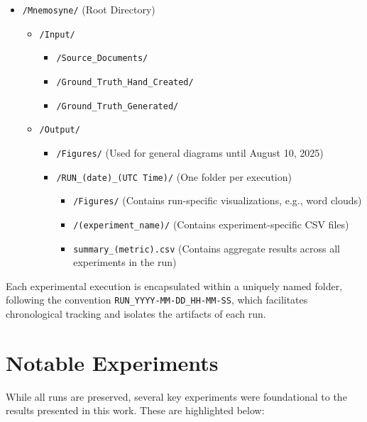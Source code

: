 \begin{itemize}
    \item \texttt{/Mnemosyne/} (Root Directory)
    \begin{itemize}
        \item \texttt{/Input/}
        \begin{itemize}
            \item \texttt{/Source\_Documents/}
            \item \texttt{/Ground\_Truth\_Hand\_Created/}
            \item \texttt{/Ground\_Truth\_Generated/}
        \end{itemize}
        \item \texttt{/Output/}
        \begin{itemize}
            \item \texttt{/Figures/} (Used for general diagrams until August 10, 2025)
            \item \texttt{/RUN\_(date)\_(UTC Time)/} (One folder per execution)
            \begin{itemize}
                \item \texttt{/Figures/} (Contains run-specific visualizations, e.g., word clouds)
                \item \texttt{/(experiment\_name)/} (Contains experiment-specific CSV files)
                \item \texttt{summary\_(metric).csv} (Contains aggregate results across all experiments in the run)
            \end{itemize}
        \end{itemize}
    \end{itemize}
\end{itemize}

Each experimental execution is encapsulated within a uniquely named folder, following the convention \texttt{RUN\_YYYY-MM-DD\_HH-MM-SS}, which facilitates chronological tracking and isolates the artifacts of each run.

\section{Notable Experiments}

While all runs are preserved, several key experiments were foundational to the results presented in this work. These are highlighted below:

